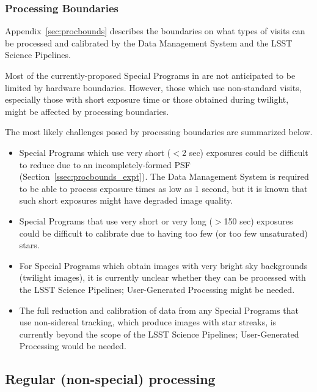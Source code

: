 \subsubsection{Processing Boundaries}\label{ssec:proc_bounds_processing}

Appendix~\ref{sec:procbounds} describes the boundaries on what types of visits 
can be processed and calibrated by the Data Management System and the LSST
Science Pipelines.

Most of the currently-proposed Special Programs in 
are not anticipated to be limited by hardware boundaries.
However, those which use non-standard visits, especially those with
short exposure time or those obtained during twilight, might
be affected by processing boundaries.

The most likely challenges posed by processing
boundaries are summarized below.

\begin{itemize}

\item Special Programs which use very short ($<$2 sec) exposures 
could be difficult to reduce due to an incompletely-formed PSF 
(Section~\ref{ssec:procbounds_expt}).
The Data Management System is required to be able to process exposure 
times as low as 1 second, but it is known that such short exposures might 
have degraded image quality.

\item Special Programs that use very short or very long ($>$150 sec) 
exposures could be difficult to calibrate due to having too few 
(or too few unsaturated) stars.

\item For Special Programs which obtain images with very bright sky backgrounds
(twilight images), it is currently unclear whether they can be processed
with the LSST Science Pipelines; User-Generated Processing might be needed.

\item The full reduction and calibration of data from any Special Programs that 
use non-sidereal tracking, which produce images with star streaks, is
currently beyond the scope of the LSST Science Pipelines; 
User-Generated Processing would be needed.

\end{itemize}

\subsection{Regular (non-special) processing}\label{ssec:proc_reg}


